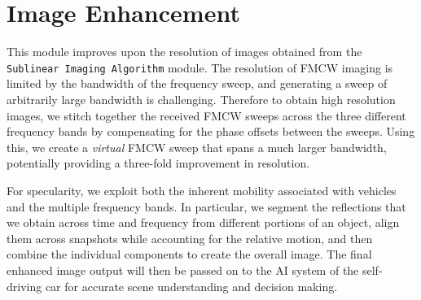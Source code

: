 \vspace{-6mm}
\section{Image Enhancement}
\vspace{-2mm}



This module improves upon the resolution of images obtained from the \texttt{Sublinear Imaging Algorithm} module.
The resolution of FMCW imaging is limited by the bandwidth of the frequency sweep, and generating a sweep of arbitrarily large bandwidth is challenging. Therefore to obtain high resolution images, we stitch together the received FMCW sweeps across the three different frequency bands by compensating for the phase offsets between the sweeps. Using this, we create a \textit{virtual} FMCW sweep that spans a much larger bandwidth, potentially providing a three-fold improvement in resolution.


For specularity, we exploit both the inherent mobility associated with vehicles and the multiple frequency bands. In particular, we segment the reflections that we obtain across time and frequency from different portions of an object, align them across snapshots while accounting for the relative motion, and then combine the individual components to create the overall image.
The final enhanced image output will then be passed on to the AI system of the self-driving car for accurate scene understanding and decision making.



\iffalse





